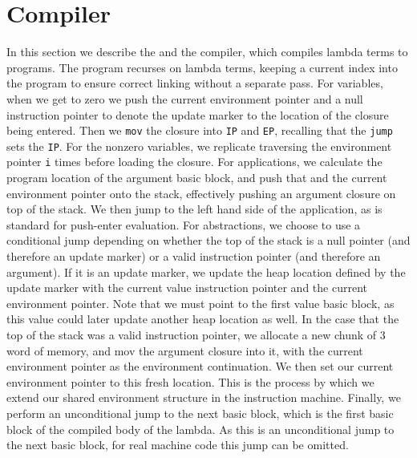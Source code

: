 \section{Compiler} \label{sec:compiler}

In this section we describe the and the compiler, which compiles lambda terms to
programs. The program recurses on lambda terms, keeping a current index into the
program to ensure correct linking without a separate pass. For variables, when
we get to zero we push the current environment pointer and a null instruction
pointer to denote the update marker to the location of the closure being
entered. Then we \texttt{mov} the closure into \texttt{IP} and \texttt{EP},
recalling that the \texttt{jump} sets the \texttt{IP}. For the nonzero
variables, we replicate traversing the environment pointer \texttt{i} times
before loading the closure. For applications, we calculate the program location
of the argument basic block, and push that and the current environment pointer
onto the stack, effectively pushing an argument closure on top of the stack. We
then jump to the left hand side of the application, as is standard for
push-enter evaluation. For abstractions, we choose to use a conditional jump
depending on whether the top of the stack is a null pointer (and therefore an
update marker) or a valid instruction pointer (and therefore an argument). If it
is an update marker, we update the heap location defined by the update marker
with the current value instruction pointer and the current environment pointer.
Note that we must point to the first value basic block, as this value could
later update another heap location as well. In the case that the top of the
stack was a valid instruction pointer, we allocate a new chunk of 3 word of
memory, and mov the argument closure into it, with the current environment
pointer as the environment continuation. We then set our current environment
pointer to this fresh location. This is the process by which we extend our
shared environment structure in the instruction machine. Finally, we perform an
unconditional jump to the next basic block, which is the first basic block of
the compiled body of the lambda. As this is an unconditional jump to the next
basic block, for real machine code this jump can be omitted. 

